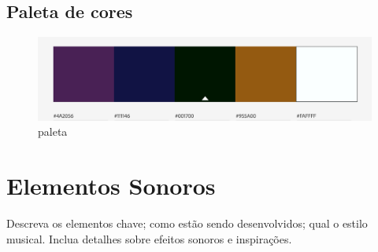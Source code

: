\subsection{Paleta de cores}
\begin{figure}[htb]
	\caption{\label{paleta}paleta}
	\begin{center}
	    \includegraphics[width=\textwidth/2]{imagens/paleta.jpg}
	\end{center}
\end{figure}

\section{Elementos Sonoros}

Descreva os elementos chave; como estão sendo desenvolvidos; qual o estilo musical. Inclua detalhes sobre efeitos sonoros e inspirações.